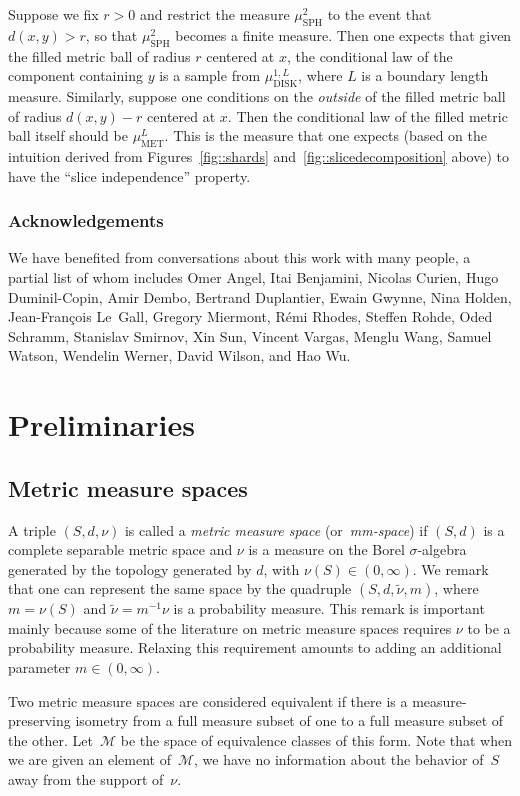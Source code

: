 \documentclass[JEP,XML,SOM,Unicode]{cedram}
\let\mathcal\mathscr
\theoremstyle{plain}
\numberwithin{theorem}{section}
\theoremstyle{definition}
\newcommand\mmspace{{\mathcal M}}
\newcommand{\mustwo}{\mu_{\mathrm{SPH}}^2}
\newcommand{\mudonel}{\mu_{ \mathrm{DISK}}^{1, L}}
\newcommand{\muml}{\mu_{\mathrm{MET}}^L}
\let\wt\widetilde
\begin{document}
Suppose we fix $r >0$ and restrict the measure $\mustwo$ to the event that $d(x,y) > r$, so that $\mustwo$ becomes a finite measure. Then one expects that given the filled metric ball of radius $r$ centered at $x$, the conditional law of the component containing $y$ is a sample from $\mudonel$, where $L$ is a boundary length measure. Similarly, suppose one conditions on the \emph{outside} of the filled metric ball of radius $d(x,y) - r$ centered at $x$. Then the conditional law of the filled metric ball itself should be $\muml$. This is the measure that one expects (based on the intuition derived from Figures~\ref{fig::shards} and~\ref{fig::slicedecomposition} above) to have the ``slice independence'' property.

\subsubsection*{Acknowledgements}
We have benefited from conversations about this work with many people, a partial list of whom includes Omer Angel, Itai Benjamini, Nicolas Curien, Hugo Duminil-Copin, Amir Dembo, Bertrand Duplantier, Ewain Gwynne, Nina Holden, Jean-François Le~Gall, Gregory Miermont, Rémi Rhodes, Steffen Rohde, Oded Schramm, Stanislav Smirnov, Xin Sun, Vincent Vargas, Menglu Wang, Samuel Watson, Wendelin Werner, David Wilson, and Hao Wu.

\section{Preliminaries}
\label{sec::preliminaries}

\subsection{Metric measure spaces}

A triple $(S, d, \nu)$ is called a \emph{metric measure space} (or~\emph{mm-space}) if $(S,d)$ is a complete separable metric space and $\nu$ is a measure on the Borel $\sigma$-algebra generated by the topology generated by $d$, with $\nu(S) \in (0, \infty)$. We remark that one can represent the same space by the quadruple $(S, d, \wt \nu, m)$, where $m = \nu(S)$ and $\wt \nu = m^{-1} \nu$ is a probability measure. This remark is important mainly because some of the literature on metric measure spaces requires $\nu$ to be a probability measure. Relaxing this requirement amounts to adding an additional parameter $m \in (0, \infty)$.

Two metric measure spaces are considered equivalent if there is a measure-preserving isometry from a full measure subset of one to a full measure subset of the other. Let~$\mmspace$ be the space of equivalence classes of this form. Note that when we are given an element of~$\mmspace$, we have no information about the behavior of~$S$ away from the support of~$\nu$.
\end{document}
